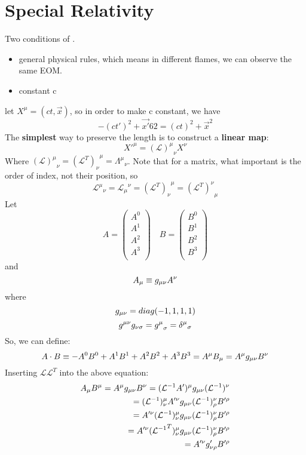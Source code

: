 \chapter{Special Relativity}
Two conditions of \SR{}. 
\begin{itemize}
    \item general physical rules, which means in different flames, we can 
	observe the same EOM.
    \item constant c
\end{itemize}
let $X^\mu=(ct, \vec{x})$, so in order to make c constant, we have
\[
    -(ct')^2+\vec{x'}62 = (ct)^2 +\vec{x}^2
\]
The \textbf{simplest} way to preserve the length is to construct a \textbf{linear map}:
\[
    X'^\mu = {(\mathcal{L})^\mu}_{\nu}X^\nu
\]
Where ${(\mathcal{L})^\mu}_{\nu} = {(\mathcal{L}^T)_\nu}^{\mu} = {\Lambda^\mu}_\nu$.
Note that for a matrix, what important is the order of index, not their position, so
\[
    {\mathcal{L}^{\mu}}_{\nu}={\mathcal{L}_{\mu}}^{\nu}={(\mathcal{L}^T)_{\nu}}^{\mu}={(\mathcal{L}^T)^{\nu}}_{\mu}
\]
Let 
\[
    A = \begin{pmatrix}
	A^0 \\
	A^1 \\
	A^2 \\
	A^3 \\
    \end{pmatrix}\quad
    B = \begin{pmatrix}
	B^0 \\
	B^1 \\
	B^2 \\
	B^3 \\
    \end{pmatrix}
\]
and 
\[
    A_\mu  \equiv g_{\mu\nu}A^\nu
\]
where 
\begin{equation}
    g_{\mu\nu} = diag(-1, 1, 1, 1)
\end{equation}
\[
    g^{\mu\nu}g_{\nu\sigma}={g^{\mu}}_\sigma={\delta^{\mu}}_\sigma 
\]
So, we can define:
\[
    A\cdot B \equiv -A^0B^0 + A^1B^1 + A^2B^2 + A^3B^3 = A^\mu B_\mu = A^\mu g_{\mu\nu}B^\nu
\]
Inserting $\mathcal{L}\mathcal{L}^T$ into the above equation:
\[
    \begin{aligned}
	A_\mu B^\mu= A^\mu g_{\mu\nu}B^\nu = (\mathcal{L}^{-1}A')^{\mu}g_{\mu\nu}(\mathcal{L}^{-1})^\nu \\
	= (\mathcal{L}^{-1})^\mu_{\nu}A'^{\nu}g_{\mu\nu}(\mathcal{L}^{-1})^\nu_{\rho}B'^\rho    \\
	= A'^{\nu}(\mathcal{L}^{-1})^\mu_{\nu}g_{\mu\nu}(\mathcal{L}^{-1})^\nu_{\rho}B'^\rho    \\
	= A'^{\nu}({\mathcal{L}^{-1}}^T)_\nu^{\mu}g_{\mu\nu}(\mathcal{L}^{-1})^\nu_{\rho}B'^\rho    \\
	= A'^{\nu}g'_{\nu\rho}B'^\rho
    \end{aligned}
\]
